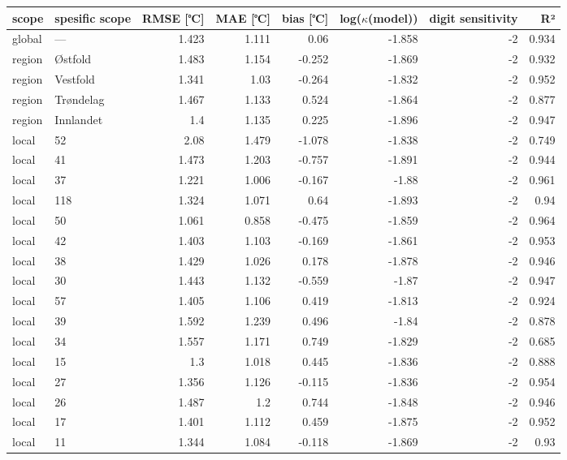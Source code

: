 \begin{tabular}{llrrrrrr}
\hline
 scope   & spesific
scope           &       RMSE
[℃] &   MAE [℃] &        bias
[℃] &   log($\kappa$(model)) &    digit
sensitivity &    R² \\
\hline
 global  & ---       & 1.423 &     1.111 &  0.06  &                 -1.858 & -2 & 0.934 \\
 region  & Østfold   & 1.483 &     1.154 & -0.252 &                 -1.869 & -2 & 0.932 \\
 region  & Vestfold  & 1.341 &     1.03  & -0.264 &                 -1.832 & -2 & 0.952 \\
 region  & Trøndelag & 1.467 &     1.133 &  0.524 &                 -1.864 & -2 & 0.877 \\
 region  & Innlandet & 1.4   &     1.135 &  0.225 &                 -1.896 & -2 & 0.947 \\
 local   & 52        & 2.08  &     1.479 & -1.078 &                 -1.838 & -2 & 0.749 \\
 local   & 41        & 1.473 &     1.203 & -0.757 &                 -1.891 & -2 & 0.944 \\
 local   & 37        & 1.221 &     1.006 & -0.167 &                 -1.88  & -2 & 0.961 \\
 local   & 118       & 1.324 &     1.071 &  0.64  &                 -1.893 & -2 & 0.94  \\
 local   & 50        & 1.061 &     0.858 & -0.475 &                 -1.859 & -2 & 0.964 \\
 local   & 42        & 1.403 &     1.103 & -0.169 &                 -1.861 & -2 & 0.953 \\
 local   & 38        & 1.429 &     1.026 &  0.178 &                 -1.878 & -2 & 0.946 \\
 local   & 30        & 1.443 &     1.132 & -0.559 &                 -1.87  & -2 & 0.947 \\
 local   & 57        & 1.405 &     1.106 &  0.419 &                 -1.813 & -2 & 0.924 \\
 local   & 39        & 1.592 &     1.239 &  0.496 &                 -1.84  & -2 & 0.878 \\
 local   & 34        & 1.557 &     1.171 &  0.749 &                 -1.829 & -2 & 0.685 \\
 local   & 15        & 1.3   &     1.018 &  0.445 &                 -1.836 & -2 & 0.888 \\
 local   & 27        & 1.356 &     1.126 & -0.115 &                 -1.836 & -2 & 0.954 \\
 local   & 26        & 1.487 &     1.2   &  0.744 &                 -1.848 & -2 & 0.946 \\
 local   & 17        & 1.401 &     1.112 &  0.459 &                 -1.875 & -2 & 0.952 \\
 local   & 11        & 1.344 &     1.084 & -0.118 &                 -1.869 & -2 & 0.93  \\
\hline
\end{tabular}